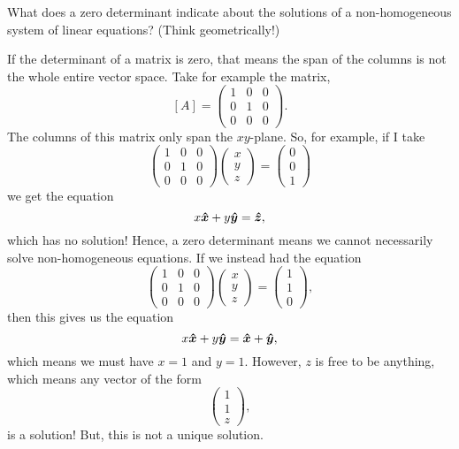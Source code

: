 \documentclass[12pt]{article} %
\begin{document}
\newpage
\begin{problem}
What does a zero determinant indicate about the solutions of a non-homogeneous system of linear equations? (Think geometrically!)
\end{problem}
\begin{solution}
If the determinant of a matrix is zero, that means the span of the columns is not the whole entire vector space.  Take for example the matrix,
\[
[A]=\begin{pmatrix} 1 & 0 & 0 \\ 0 & 1 & 0 \\ 0 & 0 & 0 \end{pmatrix}.
\]
The columns of this matrix only span the $xy$-plane. So, for example, if I take 
\[
\begin{pmatrix} 1 & 0 & 0 \\ 0 & 1 & 0 \\ 0 & 0 & 0 \end{pmatrix} \begin{pmatrix} x \\ y \\ z \end{pmatrix} = \begin{pmatrix} 0 \\ 0 \\ 1 \end{pmatrix}
\]
we get the equation
\[
x\boldsymbol{\hat{x}} + y\boldsymbol{\hat{y}} = \boldsymbol{\hat{z}},
\]
which has no solution! Hence, a zero determinant means we cannot necessarily solve non-homogeneous equations.  If we instead had the equation
\[
\begin{pmatrix} 1 & 0 & 0 \\ 0 & 1 & 0 \\ 0 & 0 & 0 \end{pmatrix} \begin{pmatrix} x \\ y \\ z \end{pmatrix} = \begin{pmatrix} 1 \\ 1 \\ 0 \end{pmatrix},
\]
then this gives us the equation
\[
x\boldsymbol{\hat{x}} + y\boldsymbol{\hat{y}} = \boldsymbol{\hat{x}} + \boldsymbol{\hat{y}},
\]
which means we must have $x=1$ and $y=1$. However, $z$ is free to be anything, which means any vector of the form
\[
\begin{pmatrix} 1 \\ 1 \\ z\end{pmatrix},
\]
is a solution! But, this is not a unique solution.
\end{solution}
\end{document}
